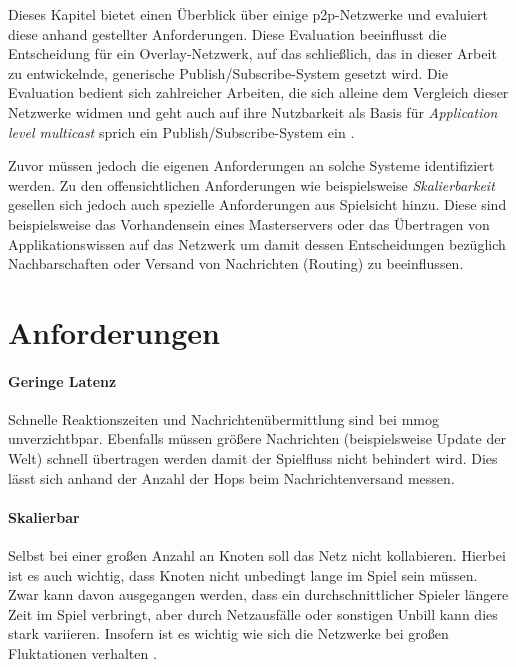 Dieses Kapitel bietet einen Überblick über einige p2p-Netzwerke und evaluiert diese anhand gestellter Anforderungen. Diese Evaluation beeinflusst die Entscheidung für ein Overlay-Netzwerk, auf das schließlich, das in dieser Arbeit zu entwickelnde, generische Publish/Subscribe-System gesetzt wird. Die Evaluation bedient sich zahlreicher Arbeiten, die sich alleine dem Vergleich dieser Netzwerke widmen \cite{Lua2005Survey, Goetz2005, Li2004Comparing, Darlagiannis2006Peertopeer, Castro2002Secure, Bo2003PeertoPeer} und geht auch auf ihre Nutzbarkeit als Basis für \emph{Application level multicast} sprich ein Publish/Subscribe-System ein \cite{Hosseini2007Survey, Fahmy2007, Castro2003Evaluation, Ratnasamy2001}.

Zuvor müssen jedoch die eigenen Anforderungen an solche Systeme identifiziert werden. Zu den offensichtlichen Anforderungen wie beispielsweise \emph{Skalierbarkeit} gesellen sich jedoch auch spezielle Anforderungen aus Spielsicht hinzu. Diese sind beispielsweise das Vorhandensein eines Masterservers oder das Übertragen von Applikationswissen auf das Netzwerk um damit dessen Entscheidungen bezüglich Nachbarschaften oder Versand von Nachrichten (Routing) zu beeinflussen.

\section{Anforderungen}

\paragraph{Geringe Latenz} Schnelle Reaktionszeiten und Nachrichtenübermittlung sind bei \ac{mmog} unverzichtbpar. Ebenfalls müssen größere Nachrichten (beispielsweise Update der Welt) schnell übertragen werden damit der Spielfluss nicht behindert wird. Dies lässt sich anhand der Anzahl der Hops beim Nachrichtenversand messen.

\paragraph{Skalierbar} Selbst bei einer großen Anzahl an Knoten soll das Netz nicht kollabieren. Hierbei ist es auch wichtig, dass Knoten nicht unbedingt lange im Spiel sein müssen. Zwar kann davon ausgegangen werden, dass ein durchschnittlicher Spieler längere Zeit im Spiel verbringt, aber durch Netzausfälle oder sonstigen Unbill kann dies stark variieren. Insofern ist es wichtig wie sich die Netzwerke bei großen Fluktationen verhalten \cite{Li2004Comparing}.


